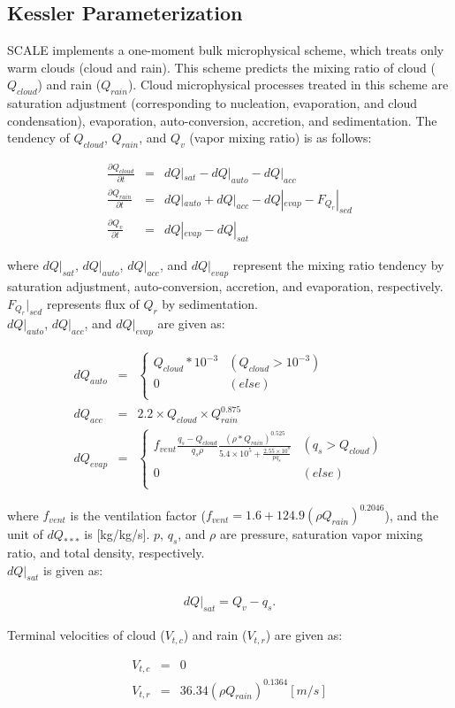 \subsection{Kessler Parameterization}
SCALE implements a one-moment bulk microphysical scheme, which treats only warm clouds (cloud and rain). This scheme predicts the mixing ratio of cloud ($Q_{cloud}$) and rain ($Q_{rain}$). Cloud microphysical processes treated in this scheme are saturation adjustment (corresponding to nucleation, evaporation, and cloud condensation), evaporation, auto-conversion, accretion, and sedimentation. The tendency of $Q_{cloud}$, $Q_{rain}$, and $Q_{v}$ (vapor mixing ratio) is as follows:

\begin{eqnarray}
\frac{\partial Q_{cloud}}{\partial t}&=&dQ|_{sat}-dQ|_{auto}-dQ|_{acc}\\
\frac{\partial Q_{rain}}{\partial t}&=&dQ|_{auto}+dQ|_{acc}-dQ|_{evap}-F_{Q_{r}}|_{sed}\\
\frac{\partial Q_{v}}{\partial t}&=&dQ|_{evap}-dQ|_{sat}
\end{eqnarray}

where $dQ|_{sat}$, $dQ|_{auto}$, $dQ|_{acc}$, and $dQ|_{evap}$ represent the mixing ratio tendency by saturation adjustment, auto-conversion, accretion, and evaporation, respectively. $F_{Q_{r}}|_{sed}$ represents flux of $Q_{r}$ by sedimentation.\\ $dQ|_{auto}$, $dQ|_{acc}$, and $dQ|_{evap}$ are given as:

\begin{eqnarray}
dQ_{auto}&=&\left\{
\begin{array}{ll}
Q_{cloud}*10^{-3} & (Q_{cloud}>10^{-3})\\
0 & (else)\\
\end{array}\right.\\
dQ_{acc}&=&2.2\times Q_{cloud}\times Q_{rain}^{0.875}\\
dQ_{evap}&=&\left\{
\begin{array}{ll}
f_{vent} \frac{q_{s}-Q_{cloud}}{q_{s}\rho}\frac{(\rho*Q_{rain})^{0.525}}{5.4\times 10^{5}+\frac{2.55\times 10^{8}}{pq_{s}}} & ( q_{s} > Q_{cloud})\\
0 & (else)\\
\end{array} \right.
\end{eqnarray}

where $f_{vent}$ is the ventilation factor ($f_{vent}=1.6+124.9(\rho Q_{rain})^{0.2046}$), and the unit of $dQ_{***}$ is [kg/kg/s]. $p$, $q_{s}$, and $\rho$ are pressure, saturation vapor mixing ratio, and total density, respectively.\\
$dQ|_{sat}$ is given as:

\begin{eqnarray}
dQ|_{sat}=Q_{v}-q_{s}.
\end{eqnarray}

Terminal velocities of cloud ($V_{t,c}$) and rain ($V_{t,r}$) are given as:

\begin{eqnarray}
V_{t,c}&=&0\\
V_{t,r}&=&36.34(\rho Q_{rain})^{0.1364} [m/s]
\end{eqnarray}



